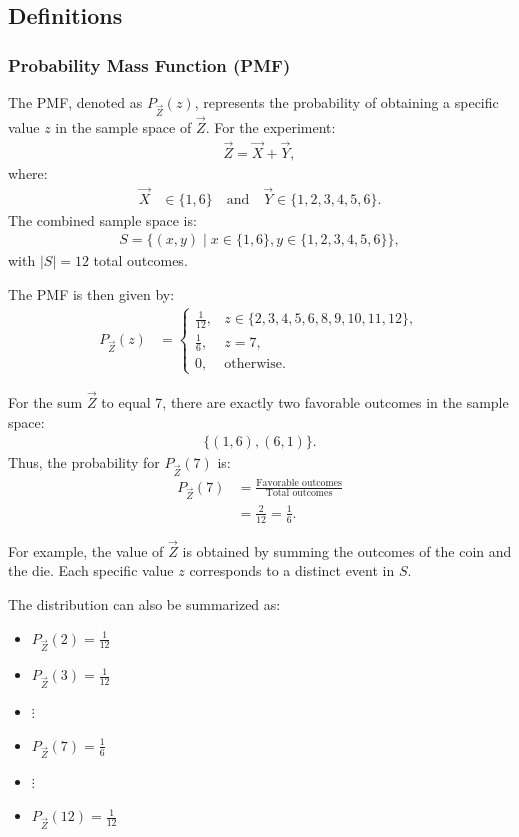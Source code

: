 \documentclass[journal]{IEEEtran}
\begin{document}
\subsection*{Definitions}
\subsubsection*{Probability Mass Function (PMF)}
The PMF, denoted as $P_{\vec{Z}}(z)$, represents the probability of obtaining a specific value $z$ in the sample space of $\vec{Z}$. For the experiment:
\begin{align}
\vec{Z} = \vec{X} + \vec{Y},
\end{align}
where:
\begin{align}
\vec{X} &\in \{1, 6\} \quad \text{and} \quad \vec{Y} \in \{1, 2, 3, 4, 5, 6\}.
\end{align}
The combined sample space is:
\begin{align}
S = \{(x, y) \mid x \in \{1, 6\}, y \in \{1, 2, 3, 4, 5, 6\}\},
\end{align}
with $|S| = 12$ total outcomes.

The PMF is then given by:
\begin{align}
    P_{\vec{Z}}(z) &=
    \begin{cases}
        \frac{1}{12}, & z \in \{2, 3, 4, 5, 6, 8, 9, 10, 11, 12\}, \\
        \frac{1}{6}, & z = 7, \\
        0, & \text{otherwise}.
    \end{cases}
\end{align}

For the sum $\vec{Z}$ to equal 7, there are exactly two favorable outcomes in the sample space:
\begin{align}
\{(1, 6), (6, 1)\}.
\end{align}
Thus, the probability for $P_{\vec{Z}}(7)$ is:
\begin{align}
P_{\vec{Z}}(7) &= \frac{\text{Favorable outcomes}}{\text{Total outcomes}} \\
     &= \frac{2}{12} = \frac{1}{6}.
\end{align}

For example, the value of $\vec{Z}$ is obtained by summing the outcomes of the coin and the die. Each specific value $z$ corresponds to a distinct event in $S$. 

The distribution can also be summarized as:
\begin{itemize}
    \item $P_{\vec{Z}}(2) = \frac{1}{12}$
    \item $P_{\vec{Z}}(3) = \frac{1}{12}$
    \item $\vdots$
    \item $P_{\vec{Z}}(7) = \frac{1}{6}$
    \item $\vdots$
    \item $P_{\vec{Z}}(12) = \frac{1}{12}$
\end{itemize}
\end{document}
